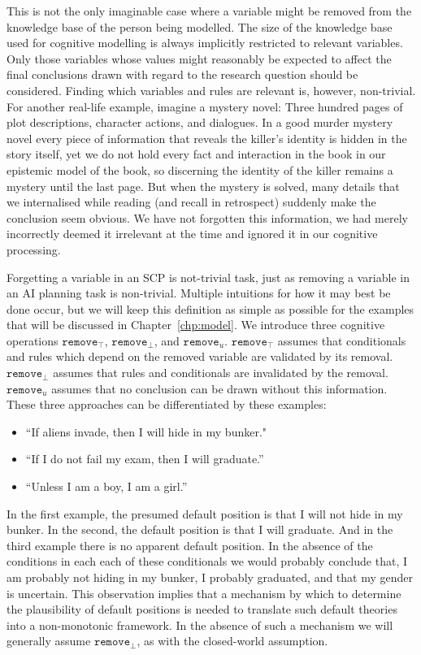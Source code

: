 This is not the only imaginable case where a variable might be removed from the knowledge base of the person being modelled. The size of the knowledge base used for cognitive modelling is always implicitly restricted to relevant variables. Only those variables whose values might reasonably be expected to affect the final conclusions drawn with regard to the research question should be considered. Finding which variables and rules are relevant is, however, non-trivial. For another real-life example, imagine a mystery novel: Three hundred pages of plot descriptions, character actions, and dialogues. In a good murder mystery novel every piece of information that reveals the killer's identity is hidden in the story itself, yet we do not hold every fact and interaction in the book in our epistemic model of the book, so discerning the identity of the killer remains a mystery until the last page. But when the mystery is solved, many details that we internalised while reading (and recall in retrospect) suddenly make the conclusion seem obvious. We have not forgotten this information, we had merely incorrectly deemed it irrelevant at the time and ignored it in our cognitive processing.

Forgetting a variable in an SCP is not-trivial task, just as removing a variable in an AI planning task is non-trivial. Multiple intuitions for how it may best be done occur, but we will keep this definition as simple as possible for the examples that will be discussed in Chapter~\ref{chp:model}. We introduce three cognitive operations $\texttt{remove}_\top$, $\texttt{remove}_\bot$, and $\texttt{remove}_u$. $\texttt{remove}_\top$ assumes that conditionals and rules which depend on the removed variable are validated by its removal. $\texttt{remove}_\bot$ assumes that rules and conditionals are invalidated by the removal. $\texttt{remove}_u$ assumes that no conclusion can be drawn without this information.  These three approaches can be differentiated by these examples:

\begin{itemize}
\item ``If aliens invade, then I will hide in my bunker."
\item ``If I do not fail my exam, then I will graduate.''
\item ``Unless I am a boy, I am a girl.''
\end{itemize}

In the first example, the presumed default position is that I will not hide in my bunker. In the second, the default position is that I will graduate. And in the third example there is no apparent default position. In the absence of the conditions in each each of these conditionals we would probably conclude that, I am probably not hiding in my bunker, I probably graduated, and that my gender is uncertain. This observation implies that a mechanism by which to determine the plausibility of default positions is needed to translate such default theories into a non-monotonic framework. In the absence of such a mechanism we will generally assume $\texttt{remove}_\bot$, as with the closed-world assumption.

